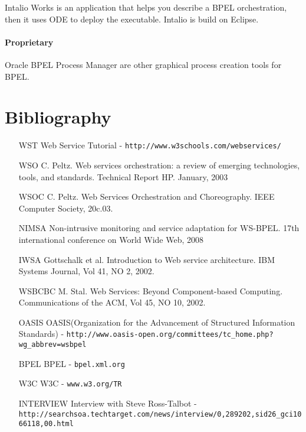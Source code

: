 \documentclass[11pt,a4paper]{article}
\begin{document}
Intalio Works is an application that helps you describe a BPEL orchestration, then it uses ODE to deploy the executable. Intalio is build on Eclipse.

\paragraph{Proprietary}
Oracle BPEL Process Manager are other graphical process creation tools for BPEL.

\section{Bibliography}
\begin{itemize}
\item[WST] Web Service Tutorial - \verb!http://www.w3schools.com/webservices/!

\item[WSO] C. Peltz. Web services orchestration: a review of emerging technologies, tools, and standards. Technical Report HP. January, 2003

\item[WSOC] C. Peltz. Web Services Orchestration and Choreography. IEEE Computer Society, 20c.03.

\item[NIMSA] Non-intrusive monitoring and service adaptation for WS-BPEL. 17th international conference on World Wide Web, 2008

\item[IWSA] Gottschalk et al. Introduction to Web service architecture. IBM Systems Journal, Vol 41, NO 2, 2002.

\item[WSBCBC] M. Stal. Web Services: Beyond Component-based Computing. Communications of the ACM, Vol 45, NO 10, 2002.

\item[OASIS] OASIS(Organization for the Advancement of Structured Information Standards) - \verb!http://www.oasis-open.org/committees/tc_home.php?wg_abbrev=wsbpel!

\item[BPEL] BPEL - \verb!bpel.xml.org!

\item[W3C] W3C - \verb!www.w3.org/TR!

\item[INTERVIEW] Interview with Steve Ross-Talbot - \verb!http://searchsoa.techtarget.com/news/interview/0,289202,sid26_gci1066118,00.html!


\end{itemize}
\end{document}
